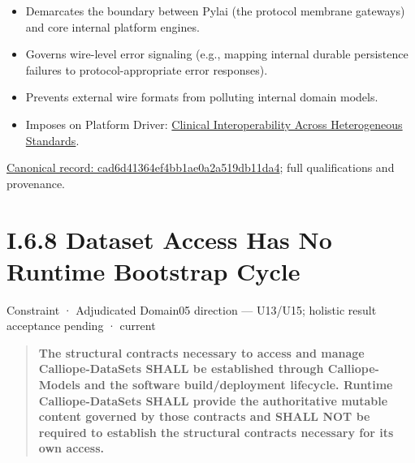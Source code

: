 \begin{itemize}


\item Demarcates the boundary between Pylai (the protocol membrane gateways) and core internal platform engines.

\item Governs wire-level error signaling (e.g., mapping internal durable persistence failures to protocol-appropriate error responses).

\item Prevents external wire formats from polluting internal domain models.

\item Imposes on Platform Driver: \href{\detokenize{../../../../../../../../../docs/markdown/01-motivation/drivers-assessments/drivers.md}}{Clinical Interoperability Across Heterogeneous Standards}.

\end{itemize}

{\footnotesize \href{../../../../../../../../continuum/motivation/constraint/cad6d41364ef4bb1ae0a2a519db11da4.md}{Canonical record: cad6d41364ef4bb1ae0a2a519db11da4}; full qualifications and provenance.}\par
\section*{I.6.8 Dataset Access Has No Runtime Bootstrap Cycle}
\label{navigation:I.6.8}

\label{element:c8c479dc9aad450ea58d07dec9aea1a6}
{\small Constraint · Adjudicated Domain05 direction — U13/U15; holistic result acceptance pending · current}\par

\begin{quote}


\textbf{The structural contracts necessary to access and manage
Calliope-DataSets SHALL be established through Calliope-Models and the
software build/deployment lifecycle. Runtime Calliope-DataSets SHALL
provide the authoritative mutable content governed by those contracts
and SHALL NOT be required to establish the structural contracts
necessary for its own access.}



\end{quote}


